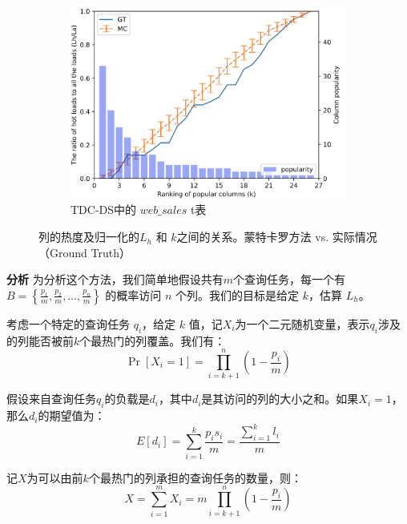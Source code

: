 \begin{figure}[]
    \begin{subfigure}[t]{0.5\textwidth}
        \centering
        \includegraphics[width=1\textwidth]{img/cw-cache/ca_web_sales}
        \caption{TDC-DS中的 $web\_sales$ t表}
        \label{fig:ca-ws}
    \end{subfigure}%
    \caption{列的热度及归一化的$L_h$ 和 $k$之间的关系。蒙特卡罗方法 vs. 实际情况（Ground Truth）}
    \label{fig:mc_gt}
\end{figure}
 
\par \noindent\textbf{分析} 为分析这个方法，我们简单地假设共有$m$个查询任务，每一个有 $B = \left\{\frac{p_{1}}{m}, \frac{p_{2}}{m}, \dots, \frac{p_{n}}{m}\right\}$ 的概率访问 $n$ 个列。我们的目标是给定 $k$，估算 $L_h$。

\par 考虑一个特定的查询任务 $q_i$，给定 $k$ 值，记$X_i$为一个二元随机变量，表示$q_i$涉及 的列能否被前$k$个最热门的列覆盖。我们有：
\begin{equation}
\Pr\left[X_{i}=1\right]=\prod_{i=k+1}^{n}\left(1-\frac{p_{i}}{m}\right)
\end{equation}

\par 假设来自查询任务$q_i$的负载是$d_i$，其中$d_i$是其访问的列的大小之和。如果$X_i =1$，那么$d_i$的期望值为：
\begin{equation}
E\left[d_i\right]=\sum_{i=1}^{k} \frac{p_{i} s_{i}}{m}=\frac{\sum_{i=1}^{k} l_{i}}{m}
\end{equation}

记$X$为可以由前$k$个最热门的列承担的查询任务的数量，则：
\begin{equation}
X = \sum_{i=1}^m X_i = m \prod_{i=k+1}^{n}\left(1-\frac{p_{i}}{m}\right)
\end{equation}

